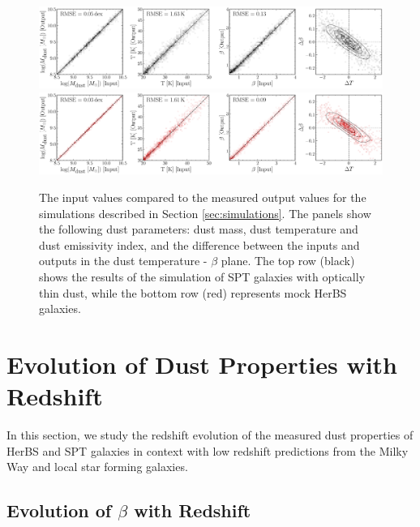 \begin{figure}
	\includegraphics[width=\columnwidth]{Figures/Figure_4_8_part1.pdf}
	\centering
	\includegraphics[width=\columnwidth]{Figures/Figure_4_8_part2.pdf}
	\caption[Comparison of the input and output parameter values from simulations]{The input values compared to the measured output values for the simulations described in Section \ref{sec:simulations}. The panels show the following dust parameters: dust mass, dust temperature and dust emissivity index, and the difference between the inputs and outputs in the dust temperature - $\beta$ plane. The top row (black) shows the results of the simulation of SPT galaxies with optically thin dust, while the bottom row (red) represents mock HerBS galaxies.}
	\label{fig:in_out_simulations}
\end{figure}

\section{Evolution of Dust Properties with Redshift}
\label{sec:redshift_evolution}

In this section, we study the redshift evolution of the measured dust properties of HerBS and SPT galaxies in context with low redshift predictions from the Milky Way and local star forming galaxies.

\subsection{Evolution of $\beta$ with Redshift}

